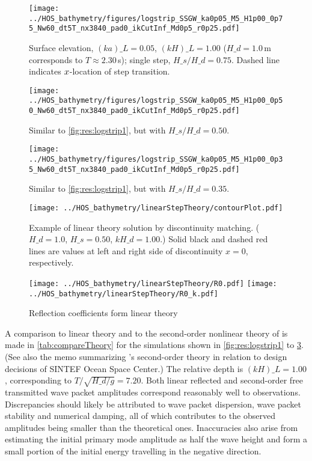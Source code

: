 \begin{figure}[H]%
\centering
\texttt{[image: ../HOS\_bathymetry/figures/logstrip\_SSGW\_ka0p05\_M5\_H1p00\_0p75\_Nw60\_dt5T\_nx3840\_pad0\_ikCutInf\_Md0p5\_r0p25.pdf]}%
\caption{Surface elevation, $(ka)\_L = 0.05$, $(kH)\_L = 1.00$ ($H\_d=1.0$\,m corresponds to $T\approx2.30$\,s); single step, $H\_s/H\_d = 0.75$. Dashed line indicates $x$-location of step transition.}%
\label{fig:res:logstrip1}%
\end{figure}
\begin{figure}[H]%
\centering 
\texttt{[image: ../HOS\_bathymetry/figures/logstrip\_SSGW\_ka0p05\_M5\_H1p00\_0p50\_Nw60\_dt5T\_nx3840\_pad0\_ikCutInf\_Md0p5\_r0p25.pdf]}%
\caption{Similar to \autoref{fig:res:logstrip1}, but with $H\_s/H\_d = 0.50$.}%
\label{fig:res:logstrip2}%
\end{figure}
\begin{figure}[H]%
\centering 															  
\texttt{[image: ../HOS\_bathymetry/figures/logstrip\_SSGW\_ka0p05\_M5\_H1p00\_0p35\_Nw60\_dt5T\_nx3840\_pad0\_ikCutInf\_Md0p5\_r0p25.pdf]}%
\caption{Similar to \autoref{fig:res:logstrip1}, but with $H\_s/H\_d = 0.35$.}%
\label{fig:res:logstrip3}%
\end{figure}


\begin{figure}[H]%
\centering
\texttt{[image: ../HOS\_bathymetry/linearStepTheory/contourPlot.pdf]}%
\caption{Example of linear theory solution by discontinuity matching. ($H\_d = 1.0$, $H\_s = 0.50$, $kH\_d = 1.00$.) Solid black and dashed red lines are values at left and right side of discontinuity $x=0$, respectively.}%
\label{fig:linearReflection:contour}%
\end{figure}

\begin{figure}[H]%
\centering
\texttt{[image: ../HOS\_bathymetry/linearStepTheory/R0.pdf]}%
\texttt{[image: ../HOS\_bathymetry/linearStepTheory/R0\_k.pdf]}%
\caption{Reflection coefficients form linear theory}%
\label{fig:linearReflection:R0}%
\end{figure}



A comparison to linear theory and to the second-order nonlinear theory of \citet{li_2021_step1} is made in \autoref{tab:compareTheory} for the simulations shown in \autoref{fig:res:logstrip1} to \ref{fig:res:logstrip3}.
(See also the memo \citet{AHA_2021_LiTheory} summarizing \citeauthor{li_2021_step1}'s second-order theory in relation to design decisions of SINTEF Ocean Space Center.)
The relative depth is $(kH)\_L=1.00$,  corresponding to $T/\sqrt{H\_d/g}=7.20$.
Both linear reflected and second-order free transmitted wave packet amplitudes correspond reasonably well to observations.
Discrepancies should likely be attributed to wave packet dispersion, wave packet stability and numerical damping, all of which contributes to the observed amplitudes being smaller than the theoretical ones.
Inaccuracies also arise from estimating the initial primary mode amplitude as half the wave height and form a small portion of the initial energy travelling in the negative direction.

